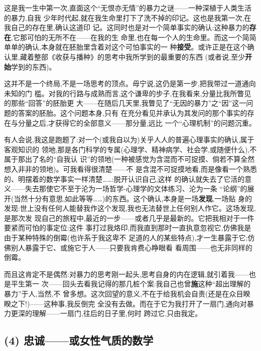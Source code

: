 这是我一生中第一次,直面这个“无恨亦无情”的暴力之谜——一种深植于人类生活的暴力,自我
少年时代起,就在我生命里打下了洗不掉的印记。这也是我第一次,在我自己的存在里,确认这道印
记。这同时也是对一个简单事实的确认:这种暴力的\textbf{存在},它那可怕的无所不在——在我的生
命里,也在每一个人的生命里。而这一个简简单单的确认,本身就在胚胎里含着对这个可怕事实的一
种\textbf{接受}。或许正是在这个确认里,藏着整部《收获与播种》的思考中我所\dmark{}学到的最重要的东西
(或者说,至少\textbf{开始}学到的东西)。

这并不是一个终局,不是一场思考的顶点。毋宁说,这仍是第一步,把我带过一道通向未知的门
槛。对我的行路与成熟而言,这个谦卑的步子,在我看来,分量比我所瞥见的那些“回答”的胚胎更
大——在随后几天里,我瞥见了“无因的暴力”之“因”这一问题的答案的胚胎。这个问题本身,只有
在充分看见并承认为其发问的那个事实的存在与分量之后,才获得它的全部意义——那分量,远比
一个“心理机制”的问题沉重。

有人会说,我这是跑题了:对一个(或我自以为)关乎人人的普遍心理事实的确认,属于客观知识的
领地,那是各门科学的专属(心理学、精神病学、社会学,或随便什么),不属于那出了名的“自我认
识”的领地(一种被感觉为含混而不可捉摸、倘若不算全然想入非非的领地)。可我看得很清楚——不
是含混不可捉摸地看,而是像看一个熟悉的、明摆着的数学事实一样清楚……:脱开认识自己,这样
的确认就失去了它活的意义——失去那使它不至于沦为一场哲学-心理学的文体练习、沦为一条
“论纲”的展开(当然十分有意思,如此等等……)的东西。这个确认,本身是一场\textbf{发现},一场贴
身的发现:世上没有任何人能替我作这个发现,我也无法替世上任何别人作它。这场发现,是那次发
现自己的旅程中,最近的一步——或者几乎是最新的。它把我相对于一件要紧而可怕的事定位:这件
事打过我烙印,而我直到那时一直执意忽视它,仿佛我是由于某种特殊的倒霉(也许系于我这卑不
足道的人的某些特点),才一生暴露于它;仿佛别人暴露于它、或施它于人——只要我肯费心睁眼看
看周围——也无非同样的倒霉。

而且这肯定不是偶然:对暴力的思考刚一起头,思考自身的内在逻辑,就引着我——也是平生第一
次——回头去看我记得的那几桩个案:我自己也曾\dmark{}\textbf{施}这种“超出理解的暴力”于人,当然,不
曾多想。这次回望的意义,不在于给我机会自责(还是在众目睽睽之下!)——这种事,我反倒完
全没有去做。而在于它为我打开了一扇门,通向对暴力更深的理解——一扇门,往后的日子里,何时
跨过它,只由我定。

\subsection{(4) 忠诚——或女性气质的数学}   %

